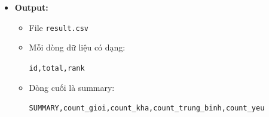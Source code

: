 \begin{itemize}
\begin{itemize}
        \item \textbf{Module 5 (Ghi report \& summary):}
        \begin{itemize}
            \item Hàm \texttt{writeResult(path, records)}
            \item Ghi file \texttt{result.csv} gồm các cột:
            \[
                \texttt{id, total, rank}
            \]
            \item Cuối file ghi thêm 1 dòng summary đếm số record theo từng xếp loại
            \item Số thực dùng \texttt{fixed << setprecision(2)}
        \end{itemize}
    \end{itemize}

    \item \textbf{Output:}
    \begin{itemize}
        \item File \texttt{result.csv}
        \item Mỗi dòng dữ liệu có dạng:
        \begin{center}
            \texttt{id,total,rank}
        \end{center}
        \item Dòng cuối là summary:
        \begin{center}
            \texttt{SUMMARY,count\_gioi,count\_kha,count\_trung\_binh,count\_yeu}
        \end{center}
    \end{itemize}
\end{itemize}

